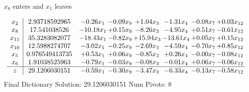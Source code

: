 \documentclass[9pt]{article}
\begin{document}
 $ x_{8} $ enters and $ x_{1} $ leaves 

 \[\begin{array}{c| c c@{\hskip 2pt} c@{\hskip 2pt} c@{\hskip 2pt} c@{\hskip 2pt} c@{\hskip 2pt} c@{\hskip 2pt} }
 x_{2}   &  2.93718592965 & -0.26 x_{1} & -0.09 x_{9} & +  1.04 x_{3} & -1.31 x_{4} & -0.08 x_{7} & +  0.03 x_{12}\\
 x_{8}   &  17.541038526 & -10.18 x_{1} & +  0.15 x_{9} & -8.26 x_{3} & -4.95 x_{4} & +  0.51 x_{7} & -0.61 x_{12}\\
 x_{11}   &  35.3283082077 & -18.43 x_{1} & -0.82 x_{9} & + 15.94 x_{3} & -13.61 x_{4} & +  0.05 x_{7} & +  0.15 x_{12}\\
 x_{10}   &  12.5988274707 & -3.02 x_{1} & -0.25 x_{9} & -2.69 x_{3} & -4.59 x_{4} & -0.70 x_{7} & +  0.85 x_{12}\\
 x_{5}   &  0.976549413735 & +  0.53 x_{1} & +  0.06 x_{9} & -0.85 x_{3} & +  0.26 x_{4} & -0.00 x_{7} & -0.08 x_{12}\\
 x_{6}   &  1.91038525963 & -0.79 x_{1} & -0.03 x_{9} & -0.08 x_{3} & -0.01 x_{4} & +  0.06 x_{7} & -0.06 x_{12}\\
\hline
z    &  29.1206030151 & -0.59 x_{1} & -0.30 x_{9} & -3.47 x_{3} & -6.33 x_{4} & -0.13 x_{7} & -0.58 x_{12}\\
\end{array}\]
Final Dictionary
Solution:  29.1206030151
Num Pivots:  8
\end{document}
